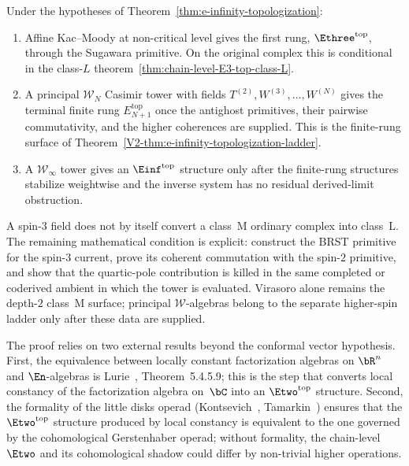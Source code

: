 \begin{corollary}
\label{cor:e-ladder-vir-wn-winfty}
\ClaimStatusConditional
{}
Under the hypotheses of Theorem~\ref{thm:e-infinity-topologization}:
\begin{enumerate}[label=\textup{(\roman*)}]
\item Affine Kac--Moody at non-critical level gives the first
 rung, $\Ethree^{\mathrm{top}}$, through the Sugawara
 primitive. On the original complex this is conditional in
 the class-$L$ theorem~\ref{thm:chain-level-E3-top-class-L}.
\item A principal $\mathcal W_N$ Casimir tower with fields
 $T^{(2)},W^{(3)},\ldots,W^{(N)}$ gives the terminal finite
 rung $E_{N+1}^{\mathrm{top}}$ once the antighost primitives,
 their pairwise commutativity, and the higher coherences are
 supplied. This is the finite-rung surface of
 Theorem~\ref{V2-thm:e-infinity-topologization-ladder}.
\item A $\mathcal W_\infty$ tower gives an
 $\Einf^{\mathrm{top}}$ structure only after the finite-rung
 structures stabilize weightwise and the inverse system has no
 residual derived-limit obstruction.
\end{enumerate}
\end{corollary}

\begin{remark}
\label{rem:class-M-free-pva-tower}
A spin-$3$ field does not by itself convert a class~$\mathrm{M}$
ordinary complex into class~$\mathrm{L}$. The remaining mathematical condition
is explicit: construct the BRST primitive for the spin-$3$ current,
prove its coherent commutation with the spin-$2$ primitive, and
show that the quartic-pole contribution is killed in the same
completed or coderived ambient in which the tower is evaluated.
Virasoro alone remains the depth-$2$ class~$\mathrm{M}$ surface;
principal $\mathcal W$-algebras belong to the separate
higher-spin ladder only after these data are supplied.
\end{remark}

\begin{remark}
\label{rem:topologization-inputs}
The proof relies on two external results beyond the
conformal vector hypothesis.
First, the equivalence between locally constant
factorization algebras on $\bR^n$ and $\En$-algebras
is Lurie~\cite{HA}, Theorem~5.4.5.9; this is the step
that converts local constancy of the factorization algebra
on~$\bC$ into an $\Etwo^{\mathrm{top}}$ structure.
Second, the formality of the little disks operad
(Kontsevich~\cite{Kon03}, Tamarkin~\cite{Tamarkin03})
ensures that the $\Etwo^{\mathrm{top}}$ structure produced
by local constancy is equivalent to the one governed by
the cohomological Gerstenhaber operad; without formality,
the chain-level $\Etwo$ and its cohomological shadow could
differ by non-trivial higher operations.
\end{remark}

